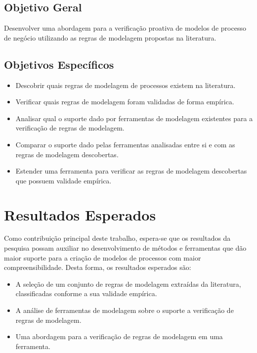 \documentclass[12pt]{article}
\begin{document}
\subsection{Objetivo Geral}

Desenvolver uma abordagem para a verificação proativa de modelos de processo de negócio utilizando as regras de modelagem propostas na literatura.

\subsection{Objetivos Específicos}
\begin{itemize}
	\item Descobrir quais regras de modelagem de processos existem na literatura.
	\item Verificar quais regras de modelagem foram validadas de forma empírica.
	\item Analisar qual o suporte dado por ferramentas de modelagem existentes para a verificação de regras de modelagem.
	\item Comparar o suporte dado pelas ferramentas analisadas entre si e com as regras de modelagem descobertas.
	\item Estender uma ferramenta para verificar as regras de modelagem descobertas que possuem validade empírica.
\end{itemize}

\section{Resultados Esperados}

Como contribuição principal deste trabalho, espera-se que os resultados da pesquisa possam auxiliar no desenvolvimento de métodos e ferramentas que dão maior suporte para a criação de modelos de processos com maior compreensibilidade. Desta forma, os resultados esperados são:

\begin{itemize}
	\item A seleção de um conjunto de regras de modelagem extraídas da literatura, classificadas conforme a sua validade empírica.
	\item A análise de ferramentas de modelagem sobre o suporte a verificação de regras de modelagem.
	\item Uma abordagem para a verificação de regras de modelagem em uma ferramenta.
\end{itemize}
\end{document}
